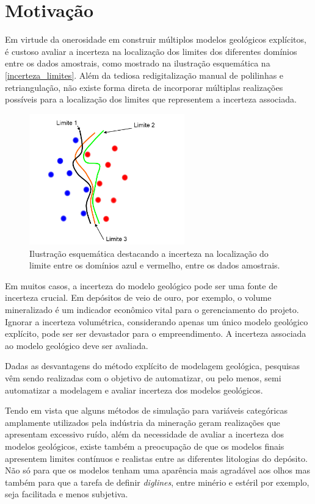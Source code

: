 \section{Motivação}

Em virtude da onerosidade em construir múltiplos modelos geológicos explícitos, é custoso avaliar a incerteza na localização dos limites dos diferentes domínios entre os dados amostrais, como mostrado na ilustração esquemática na \autoref{incerteza_limites}. Além da tediosa redigitalização manual de polilinhas e retriangulação, não existe forma direta de incorporar múltiplas realizações possíveis para a localização dos limites que representem a incerteza associada.

\begin{figure}[H]
    \centering
	\caption{\label{incerteza_limites}Ilustração esquemática destacando a incerteza na localização do limite entre os domínios azul e vermelho, entre os dados amostrais.}
	\includegraphics[width=0.6\textwidth]{capitulo_1/imagens/incerteza_limites}
\end{figure}

Em muitos casos, a incerteza do modelo geológico pode ser uma fonte de incerteza crucial. Em depósitos de veio de ouro, por exemplo, o volume mineralizado é um indicador econômico vital para o gerenciamento do projeto. Ignorar a incerteza volumétrica, considerando apenas um único modelo geológico explícito, pode ser ser devastador para o empreendimento. A incerteza associada ao modelo geológico deve ser avaliada.

Dadas as desvantagens do método explícito de modelagem geológica, pesquisas vêm sendo realizadas com o objetivo de automatizar, ou pelo menos, semi automatizar a modelagem e avaliar incerteza dos modelos geológicos.

Tendo em vista que alguns métodos de simulação para variáveis categóricas amplamente utilizados pela indústria da mineração geram realizações que apresentam excessivo ruído, além da necessidade de avaliar a incerteza dos modelos geológicos, existe também a preocupação de que os modelos finais apresentem limites contínuos e realistas entre as diferentes litologias do depósito. Não só para que os modelos tenham uma aparência mais agradável aos olhos mas também para que a tarefa de definir \textit{diglines}, entre minério e estéril por exemplo, seja facilitada e menos subjetiva.

